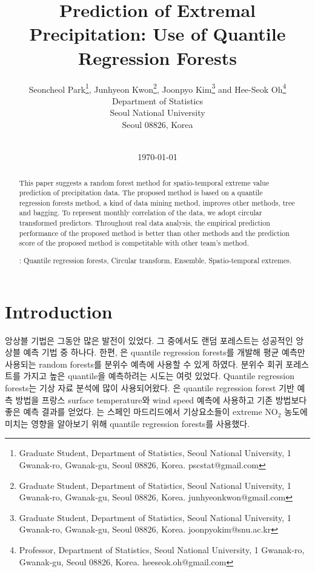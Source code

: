 \documentclass[11pt,titlepage]{article}
\title{\bf Prediction of Extremal Precipitation: Use of Quantile Regression Forests
\medskip
}
\author{
	Seoncheol Park\footnote{Graduate Student, Department of Statistics, Seoul National
		University, 1 Gwanak-ro, Gwanak-gu, Seoul 08826, Korea. 
		pscstat@gmail.com}, Junhyeon Kwon\footnote{Graduate Student, Department of Statistics, Seoul National
		University, 1 Gwanak-ro, Gwanak-gu, Seoul 08826, Korea. 
		junhyeonkwon@gmail.com}, Joonpyo Kim\footnote{Graduate Student, Department of Statistics, Seoul National
		University, 1 Gwanak-ro, Gwanak-gu, Seoul 08826, Korea. 
		joonpyokim@snu.ac.kr} and Hee-Seok Oh\footnote{Professor, Department of Statistics, Seoul National
		University, 1 Gwanak-ro, Gwanak-gu, Seoul 08826, Korea. 
		heeseok.oh@gmail.com} \\
	Department of Statistics\\
	Seoul National University\\
	Seoul 08826, Korea\\
	\\
}
\date{\today}
\begin{document}
	
	\maketitle
	
	\begin{abstract}
		
		This paper suggests a random forest method for spatio-temporal extreme value prediction of precipitation data. The proposed method is based on a quantile regression forests method, a kind of data mining method, improves other methods, tree and bagging. To represent monthly correlation of the data, we adopt circular transformed predictors. Throughout real data analysis, the empirical prediction performance of the proposed method is better than other methods and the prediction score of the proposed method is competitable with other team's method.
		
		
		\vskip 7mm
		
		: Quantile regression forests, Circular transform, Ensemble, Spatio-temporal extremes.
		
	\end{abstract}

	\section{Introduction}
	앙상블 기법은 그동안 많은 발전이 있었다. 그 중에서도 랜덤 포레스트는 성공적인 앙상블 예측 기법 중 하나다. 한편, \citep{Meinshausen2006}은 quantile regression forests를 개발해 평균 예측만 사용되는 random forests를 분위수 예측에 사용할 수 있게 하였다. 분위수 회귀 포레스트를 가지고 높은 quantile을 예측하려는 시도는 여럿 있었다. Quantile regression forests는 기상 자료 분석에 많이 사용되어왔다.  \citep{Taillardat2016}은 quantile regression forest 기반 예측 방법을 프랑스 surface temperature와 wind speed 예측에 사용하고 기존 방법보다 좋은 예측 결과를 얻었다. \citep{Aznarte2017}는 스페인 마드리드에서 기상요소들이 extreme $\text{NO}_{2}$ 농도에 미치는 영향을 알아보기 위해 quantile regression forests를 사용했다.
	
\end{document}
